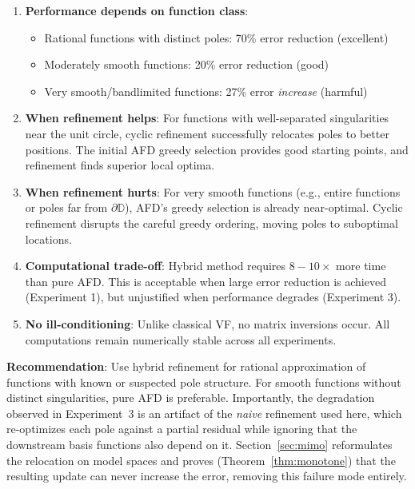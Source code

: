\documentclass[journal]{IEEEtran}%
\begin{document}
\begin{enumerate}
  \item \textbf{Performance depends on function class}:
  \begin{itemize}
    \item Rational functions with distinct poles: 70\% error reduction (excellent)
    \item Moderately smooth functions: 20\% error reduction (good)
    \item Very smooth/bandlimited functions: 27\% error \emph{increase} (harmful)
  \end{itemize}

  \item \textbf{When refinement helps}: For functions with well-separated singularities near the unit circle, cyclic refinement successfully relocates poles to better positions. The initial AFD greedy selection provides good starting points, and refinement finds superior local optima.

  \item \textbf{When refinement hurts}: For very smooth functions (e.g., entire functions or poles far from $\partial\mathbb{D}$), AFD's greedy selection is already near-optimal. Cyclic refinement disrupts the careful greedy ordering, moving poles to suboptimal locations.

  \item \textbf{Computational trade-off}: Hybrid method requires $8-10\times$ more time than pure AFD. This is acceptable when large error reduction is achieved (Experiment 1), but unjustified when performance degrades (Experiment 3).

  \item \textbf{No ill-conditioning}: Unlike classical VF, no matrix inversions occur. All computations remain numerically stable across all experiments.
\end{enumerate}

\textbf{Recommendation}: Use hybrid refinement for rational approximation of functions with known or suspected pole structure. For smooth functions without distinct singularities, pure AFD is preferable. Importantly, the degradation observed in Experiment~3 is an artifact of the \emph{naive} refinement used here, which re-optimizes each pole against a partial residual while ignoring that the downstream basis functions also depend on it. Section~\ref{sec:mimo} reformulates the relocation on model spaces and proves (Theorem~\ref{thm:monotone}) that the resulting update can never increase the error, removing this failure mode entirely.
\end{document}
